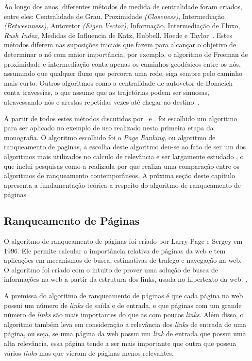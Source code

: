 Ao longo dos anos, diferentes métodos de medida de centralidade foram criados, entre eles: Centralidade de Grau, Proximidade \textit{(Closeness)}, Intermediação \textit{(Betweenness)}, Autovetor \textit{(Eigen Vector)}, Informação, Intermediação de Fluxo, \textit{Rush Index}, Medidas de Influencia de Katz, Hubbell, Hoede e Taylor~\cite{centrality}. Estes métodos diferem nas suposições iniciais que fazem para alcançar o objetivo de determinar o nó com maior importância, por exemplo, o algoritmo de Freeman de proximidade e intermediação conta apenas os caminhos geodésicos entre os nós, assumindo que qualquer fluxo que percorra uma rede, siga sempre pelo caminho mais curto. Outros algoritmos como a centralidade de autovetor de Bonacich conta travessias, o que assume que as trajetórias podem ser sinuosas, atravessando nós e arestas repetidas vezes até chegar ao destino~\cite{Bonacich87}.

A partir de todos estes métodos discutidos por~\cite{centrality} e \protect \cite{Bonacich87}, foi escolhido um algoritmo para ser aplicado no exemplo de uso realizado nesta primeira etapa da monografia. O algoritmo escolhido foi o \textit{Page Ranking}, ou algoritmo de ranqueamento de paginas, a escolha deste algoritmo deu-se ao fato de ser um dos algoritmos mais utilizados no calculo de relevância e ser largamente estudado \cite{brin}, o que inclui pesquisas como a realizada por \cite{muppidi} que realiza uma comparação entre os algoritmos de ranqueamento contemporâneos. A próxima seção deste capítulo apresenta a fundamentação teórica a respeito do algoritmo de ranqueamento de páginas

\subsection{Ranqueamento de Páginas}
\label{ref:cen:pag}
O algoritmo de ranqueamento de páginas foi criado por Larry Page e Sergey em 1996. Ele permite calcular a importância relativa de páginas da web e tem aplicações em mecanismos de busca, estimativas de trafego e navegação na web. O algoritmo foi criado com o intuito de prover uma solução de busca de informações na web a partir da estrutura dos links, usada no hipertexto da web. \cite{pageRank}.

A premissa do algoritmo de ranqueamento de páginas é que cada página na web possui um número de \textit{links} de saída e de entrada, e que páginas com um grande número de \textit{links} são mais importantes do que as com poucos \textit{links}. Além disso, o algoritmo também leva em consideração a relevância dos \textit{links} de entrada de uma página, ou seja, se uma página da web possui um \textit{link} de entrada que possui uma alta relevância, essa página tende a ser mais importante que outra que possua vários \textit{links} mas que vieram de páginas menos relevantes.

